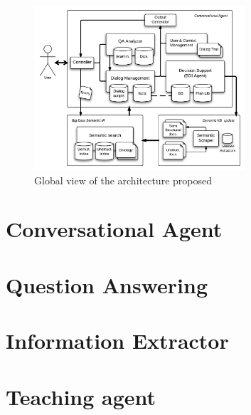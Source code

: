 \begin{figure}[!htbp]
    \centering
    \includegraphics[width=0.7\textwidth]{img/arch/global_1-3.png}
    \caption{Global view of the architecture proposed}
    \label{fig:arch1}
\end{figure}

\section{Conversational Agent}

\section{Question Answering}

\section{Information Extractor}

\section{Teaching agent}